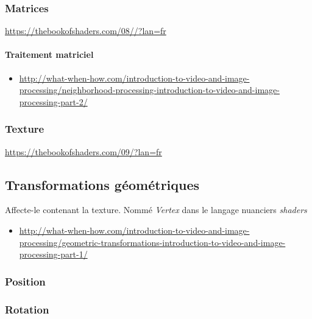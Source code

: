 \documentclass[
  french,
]{book}
\providecommand{\tightlist}{%
  \setlength{\itemsep}{0pt}\setlength{\parskip}{0pt}}
\begin{document}
\hypertarget{matrices}{%
\subsubsection{Matrices}\label{matrices}}

\url{https://thebookofshaders.com/08//?lan=fr}

\hypertarget{traitement-matriciel}{%
\paragraph{Traitement matriciel}\label{traitement-matriciel}}

\begin{itemize}
\tightlist
\item
  \url{http://what-when-how.com/introduction-to-video-and-image-processing/neighborhood-processing-introduction-to-video-and-image-processing-part-2/}
\end{itemize}

\hypertarget{texture}{%
\subsubsection{Texture}\label{texture}}

\url{https://thebookofshaders.com/09/?lan=fr}

\hypertarget{transformations-guxe9omuxe9triques}{%
\subsection{Transformations géométriques}\label{transformations-guxe9omuxe9triques}}

Affecte-le contenant la texture. Nommé \emph{Vertex} dans le langage nuanciers \emph{shaders}

\begin{itemize}
\tightlist
\item
  \url{http://what-when-how.com/introduction-to-video-and-image-processing/geometric-transformations-introduction-to-video-and-image-processing-part-1/}
\end{itemize}

\hypertarget{position}{%
\subsubsection{Position}\label{position}}

\hypertarget{rotation}{%
\subsubsection{Rotation}\label{rotation}}
\end{document}
